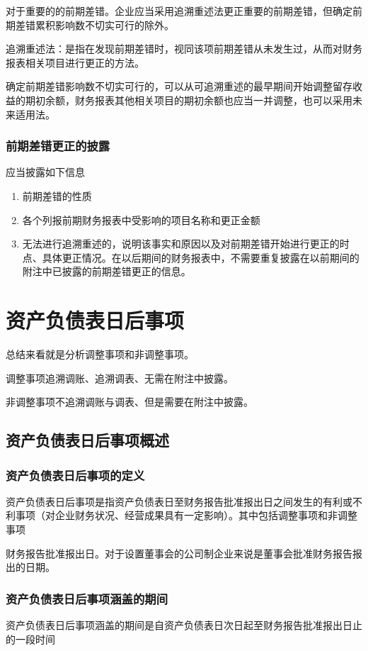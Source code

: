 \documentclass[UTF8,12pt]{ctexart}
\numberwithin{equation}{section} %
\numberwithin{figure}{section}
\numberwithin{table}{section}
\begin{document}
	对于重要的的前期差错。企业应当采用追溯重述法更正重要的前期差错，但确定前期差错累积影响数不切实可行的除外。
	
	追溯重述法：是指在发现前期差错时，视同该项前期差错从未发生过，从而对财务报表相关项目进行更正的方法。
	
	确定前期差错影响数不切实可行的，可以从可追溯重述的最早期间开始调整留存收益的期初余额，财务报表其他相关项目的期初余额也应当一并调整，也可以采用未来适用法。
	
	\subsubsection{前期差错更正的披露}
	应当披露如下信息
	\begin{enumerate}
		\item 前期差错的性质
		
		\item 各个列报前期财务报表中受影响的项目名称和更正金额
		
		\item 无法进行追溯重述的，说明该事实和原因以及对前期差错开始进行更正的时点、具体更正情况。在以后期间的财务报表中，不需要重复披露在以前期间的附注中已披露的前期差错更正的信息。
	\end{enumerate}
	
	\newpage
	
	\section{资产负债表日后事项}
	总结来看就是分析调整事项和非调整事项。
	
	调整事项追溯调账、追溯调表、无需在附注中披露。
	
	非调整事项不追溯调账与调表、但是需要在附注中披露。
	
	\subsection{资产负债表日后事项概述}
	\subsubsection{资产负债表日后事项的定义}
	资产负债表日后事项是指资产负债表日至财务报告批准报出日之间发生的有利或不利事项（对企业财务状况、经营成果具有一定影响）。其中包括调整事项和非调整事项
	
	财务报告批准报出日。对于设置董事会的公司制企业来说是董事会批准财务报告报出的日期。
	
	\subsubsection{资产负债表日后事项涵盖的期间}
	资产负债表日后事项涵盖的期间是自资产负债表日次日起至财务报告批准报出日止的一段时间
	
\end{document}
